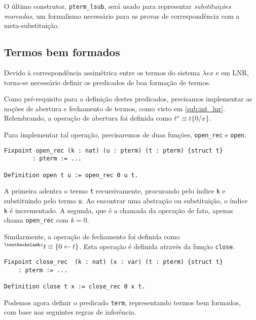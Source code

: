 O último construtor, \texttt{pterm\_lsub}, será usado para representar
\emph{substituições marcadas}, um formalismo necessário para as provas de
correspondência com a meta-substituição.

\subsection{Termos bem formados}

Devido à correspondência assimétrica entre os termos do sistema $\lambda ex$ e
em LNR, torna-se necessário definir os predicados de boa formação de termos.

Como pré-requisito para a definição destes predicados, precisamos implementar as
noções de abertura e fechamento de termos, como visto em \ref{sub:int_lnr}. 
Relembrando, a operação de abertura foi definida como $t^{x} \equiv t\{0/x\}$.

Para implementar tal operação, precisaremos de duas funções, \texttt{open\_rec}
e \texttt{open}.

\begin{lstlisting}[basicstyle=\small]
Fixpoint open_rec (k : nat) (u : pterm) (t : pterm) {struct t} 
        : pterm := ...

Definition open t u := open_rec 0 u t.
\end{lstlisting}

A primeira adentra o termo \texttt{t} recursivamente, procurando pelo índice
\texttt{k} e substituindo pelo termo \texttt{u}. Ao encontrar uma abstração ou
substituição, o índice \texttt{k} é incrementado.  A segunda, que é a chamada da
operação de fato, apenas chama \texttt{open\_rec} com $k = 0$.

Similarmente, a operação de fechamento foi definida como $ ^{\textbackslash x}t
\equiv \{0 \leftarrow t\}$. Esta operação é definida através da função
\texttt{close}.

\begin{lstlisting}[basicstyle=\small]
Fixpoint close_rec  (k : nat) (x : var) (t : pterm) {struct t} 
    : pterm := ...

Definition close t x := close_rec 0 x t.
\end{lstlisting}

Podemos agora definir o predicado \texttt{term}, representando termos bem
formados, com base nas seguintes regras de inferência.


